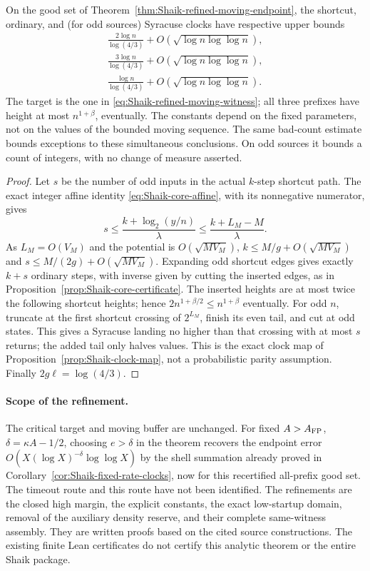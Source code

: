 \begin{corollary}
\label{cor:Shaik-refined-moving-clocks}
On the good set of Theorem~\ref{thm:Shaik-refined-moving-endpoint},
the shortcut, ordinary, and (for odd sources) Syracuse clocks have
respective upper bounds
\[
 \begin{gathered}
 \frac{2\log n}{\log(4/3)}+O(\sqrt{\log n\log\log n}),\\
 \frac{3\log n}{\log(4/3)}+O(\sqrt{\log n\log\log n}),\\
 \frac{\log n}{\log(4/3)}+O(\sqrt{\log n\log\log n}).
 \end{gathered}
\]
The target is the one in \eqref{eq:Shaik-refined-moving-witness};
all three prefixes have height at most \(n^{1+\beta}\), eventually.
The constants depend on the fixed parameters, not on the values of
the bounded moving sequence. The same bad-count estimate bounds
exceptions to these simultaneous conclusions. On odd sources it
bounds a count of integers, with no change of measure asserted.
\end{corollary}
\begin{proof}
Let \(s\) be the number of odd inputs in the actual \(k\)-step
shortcut path. The exact integer affine identity
\eqref{eq:Shaik-core-affine}, with its nonnegative numerator, gives
\[
 s\le\frac{k+\log_2(y/n)}{\lambda}
       \le\frac{k+L_M-M}{\lambda}.
\]
As \(L_M=O(V_M)\) and the potential is \(O(\sqrt{MV_M})\),
\(k\le M/g+O(\sqrt{MV_M})\) and
\(s\le M/(2g)+O(\sqrt{MV_M})\).
Expanding odd shortcut edges gives exactly \(k+s\) ordinary steps,
with inverse given by cutting the inserted edges, as in
Proposition~\ref{prop:Shaik-core-certificate}. The inserted heights
are at most twice the following shortcut heights; hence
\(2n^{1+\beta/2}\le n^{1+\beta}\) eventually.
For odd \(n\), truncate at the first shortcut crossing of \(2^{L_M}\),
finish its even tail, and cut at odd states. This gives a Syracuse
landing no higher than that crossing with at most \(s\) returns;
the added tail only halves values. This is the exact clock map of
Proposition~\ref{prop:Shaik-clock-map}, not a probabilistic parity
assumption. Finally \(2g\ell=\log(4/3)\).
\end{proof}

\paragraph{Scope of the refinement.}
The critical target and moving buffer are unchanged. For fixed
\(A>A_{\rm FP}\), \(\delta=\kappa A-1/2\), choosing \(e>\delta\)
in the theorem recovers the endpoint error
\(O(X(\log X)^{-\delta}\log\log X)\) by the shell summation already
proved in Corollary~\ref{cor:Shaik-fixed-rate-clocks}, now for this
recertified all-prefix good set. The timeout route and this route
have not been identified. The refinements are the closed high margin,
the explicit constants, the exact low-startup domain, removal of the
auxiliary density reserve, and their complete same-witness assembly.
They are written proofs based on the cited source constructions.
The existing finite Lean certificates do not certify this analytic
theorem or the entire Shaik package.

